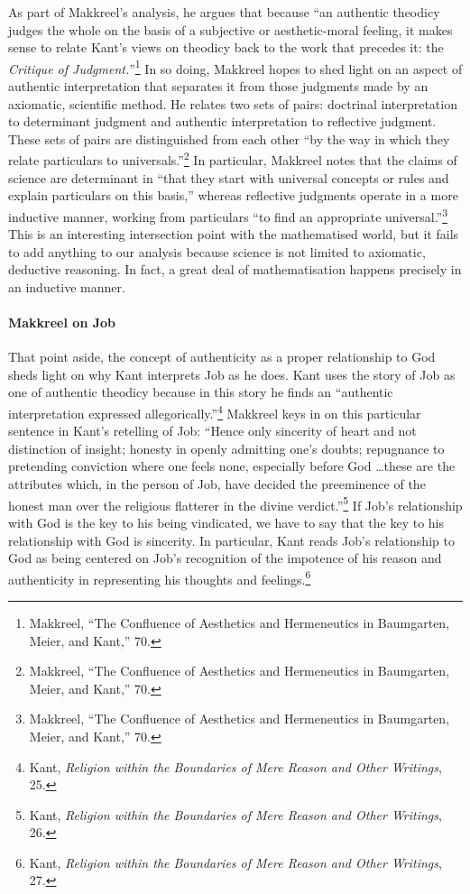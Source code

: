\documentclass[12pt]{article}
\begin{document}
	As part of Makkreel's analysis, he argues that because ``an authentic theodicy judges the whole on the basis of a subjective or aesthetic-moral feeling, it makes sense to relate Kant's views on theodicy back to the work that precedes it: the \emph{Critique of Judgment.}''\footnote{Makkreel, ``The Confluence of Aesthetics and Hermeneutics in Baumgarten, Meier, and Kant,'' 70.} In so doing, Makkreel hopes to shed light on an aspect of authentic interpretation that separates it from those judgments made by an axiomatic, scientific method. He relates two sets of pairs: doctrinal interpretation to determinant judgment and authentic interpretation to reflective judgment. These sets of pairs are distinguished from each other ``by the way in which they relate particulars to universals.''\footnote{Makkreel, ``The Confluence of Aesthetics and Hermeneutics in Baumgarten, Meier, and Kant,'' 70.} In particular, Makkreel notes that the claims of science are determinant in ``that they start with universal concepts or rules and explain particulars on this basis,'' whereas reflective judgments operate in a more inductive manner, working from particulars ``to find an appropriate universal.''\footnote{Makkreel, ``The Confluence of Aesthetics and Hermeneutics in Baumgarten, Meier, and Kant,'' 70.} This is an interesting intersection point with the mathematised world, but it fails to add anything to our analysis because science is not limited to axiomatic, deductive reasoning. In fact, a great deal of mathematisation happens precisely in an inductive manner. 
	
	\paragraph*{Makkreel on Job} That point aside, the concept of authenticity as a proper relationship to God sheds light on why Kant interprets Job as he does. Kant uses the story of Job as one of authentic theodicy because in this story he finds an ``authentic interpretation expressed allegorically.''\footnote{Kant, \emph{Religion within the Boundaries of Mere Reason and Other Writings}, 25.} Makkreel keys in on this particular sentence in Kant's retelling of Job: ``Hence only sincerity of heart and not distinction of insight; honesty in openly admitting one's doubts; repugnance to pretending conviction where one feels none, especially before God \ldots these are the attributes which, in the person of Job, have decided the preeminence of the honest man over the religious flatterer in the divine verdict.''\footnote{Kant, \emph{Religion within the Boundaries of Mere Reason and Other Writings}, 26.} If Job's relationship with God is the key to his being vindicated, we have to say that the key to his relationship with God is sincerity. In particular, Kant reads Job's relationship to God as being centered on Job's recognition of the impotence of his reason and authenticity in representing his thoughts and feelings.\footnote{Kant, \emph{Religion within the Boundaries of Mere Reason and Other Writings}, 27.}
	
\end{document}
